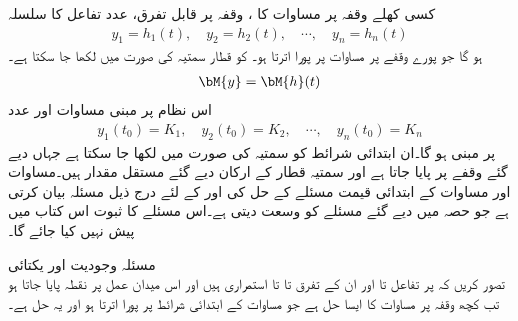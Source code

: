 کسی کھلے وقفہ  پر مساوات  کا ، وقفہ  پر قابل تفرق،  عدد  تفاعل کا سلسلہ
\begin{align*}
y_1=h_1(t),\quad y_2=h_2(t),\quad \cdots, \quad y_n=h_n(t)
\end{align*}
ہو گا جو  پورے  وقفے پر مساوات  پر پورا اترتا ہو۔ کو قطار سمتیہ  کی صورت میں لکھا جا سکتا ہے۔
\begin{align*}
\bM{y}=\bM{h}(t)
\end{align*}
اس نظام پر مبنی  مساوات  اور   عدد  
\begin{align}\label{مساوات_نظام_عمومی_ب}
y_1(t_0)=K_1, \quad y_2(t_0)=K_2,\quad \cdots,\quad y_n(t_0)=K_n
\end{align}
پر مبنی ہو گا۔ان ابتدائی شرائط کو سمتیہ کی صورت میں  لکھا جا سکتا ہے جہاں  دیے گئے وقفے پر پایا جاتا ہے اور سمتیہ قطار  کے ارکان دیے گئے مستقل مقدار ہیں۔مساوات  اور مساوات  کے ابتدائی قیمت مسئلے کے حل کی  اور  کے لئے  درج ذیل مسئلہ بیان کرتی ہے جو حصہ  میں دیے گئے مسئلے کو وسعت دیتی ہے۔اس مسئلے کا ثبوت اس کتاب میں پیش نہیں کیا جائے گا۔

\quad مسئلہ وجودیت اور یکتائی \\
تصور کریں کہ   پر  تفاعل  تا  اور ان کے تفرق  تا   تا  استمراری ہیں اور اس میدان عمل پر نقطہ  پایا جاتا ہو تب کچھ وقفہ  پر مساوات  کا ایسا حل  ہے جو مساوات  کے ابتدائی شرائط پر پورا اترتا ہو اور  یہ حل  ہے۔

